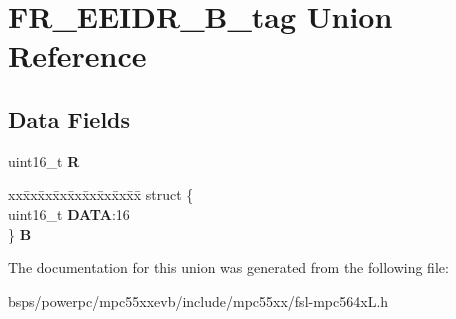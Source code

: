 \hypertarget{unionFR__EEIDR__16B__tag}{}\section{F\+R\+\_\+\+E\+E\+I\+D\+R\+\_\+B\+\_\+tag Union Reference}
\label{unionFR__EEIDR__16B__tag}
\subsection*{Data Fields}
\begin{DoxyCompactItemize}
\item 
\mbox{\label{unionFR__EEIDR__16B__tag_a86e07e563e4111ada0d76f2c035058a2}} 
uint16\+\_\+t {\bfseries R}
\item 
\mbox{\label{unionFR__EEIDR__16B__tag_a6f255a39a1cd76e75e9efe50238ba4c9}} 
\begin{tabbing}
xx\=xx\=xx\=xx\=xx\=xx\=xx\=xx\=xx\=\kill
struct \{\\
\>uint16\_t {\bfseries DATA}:16\\
\} {\bfseries B}\\

\end{tabbing}\end{DoxyCompactItemize}


The documentation for this union was generated from the following file\+:\begin{DoxyCompactItemize}
\item 
bsps/powerpc/mpc55xxevb/include/mpc55xx/fsl-\/mpc564x\+L.\+h\end{DoxyCompactItemize}
